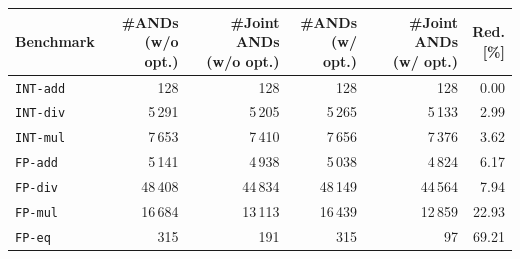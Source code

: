 \begin{tabular}{lrrrrr}
    \toprule[1.2pt]
    Benchmark &
    \makecell{\#ANDs\\(w/o opt.)} &
    \makecell{\#Joint ANDs\\(w/o opt.)} &
    \makecell{\#ANDs\\(w/ opt.)} &
    \makecell{\#Joint ANDs\\(w/ opt.)} &
    \makecell{Red.\\{} [\%]} \\
    \midrule
    \texttt{INT-add} &     128  &     128 &     128  &     128 &  0.00  \\
    \texttt{INT-div} &  5\,291  &  5\,205 &  5\,265  &  5\,133 &  2.99  \\
    \texttt{INT-mul} &  7\,653  &  7\,410 &  7\,656  &  7\,376 &  3.62  \\
    \texttt{FP-add}  &  5\,141  &  4\,938 &  5\,038  &  4\,824 &  6.17  \\
    \texttt{FP-div}  & 48\,408  & 44\,834 & 48\,149  & 44\,564 &  7.94  \\
    \texttt{FP-mul}  & 16\,684  & 13\,113 & 16\,439  & 12\,859 & 22.93  \\
    \texttt{FP-eq}   &     315  &     191 &     315  &      97 & 69.21  \\
    \bottomrule[1.2pt]
\end{tabular}
